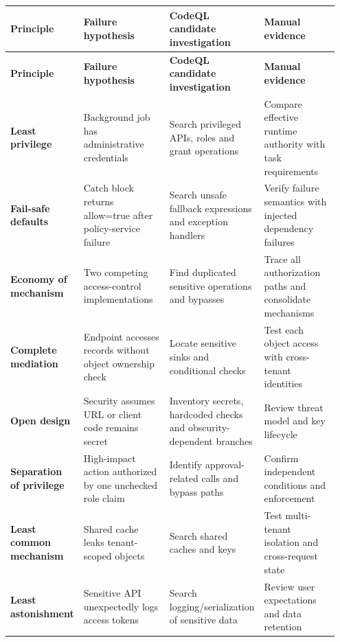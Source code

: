 \documentclass[11pt,letterpaper,oneside]{book}
\begin{document}
\small
\setlength{\tabcolsep}{2pt}
\renewcommand{\arraystretch}{1.18}
\begin{longtable}{>{\raggedright\arraybackslash}p{0.17\linewidth}>{\raggedright\arraybackslash}p{0.27\linewidth}>{\raggedright\arraybackslash}p{0.27\linewidth}>{\raggedright\arraybackslash}p{0.24\linewidth}}
\toprule
\textbf{Principle} & \textbf{Failure hypothesis} & \textbf{CodeQL candidate investigation} & \textbf{Manual evidence}\\
\midrule
\endfirsthead
\toprule
\textbf{Principle} & \textbf{Failure hypothesis} & \textbf{CodeQL candidate investigation} & \textbf{Manual evidence}\\
\midrule
\endhead
\textbf{Least privilege} & Background job has administrative credentials & Search privileged APIs, roles and grant operations & Compare effective runtime authority with task requirements\\
\textbf{Fail-safe defaults} & Catch block returns allow=true after policy-service failure & Search unsafe fallback expressions and exception handlers & Verify failure semantics with injected dependency failures\\
\textbf{Economy of mechanism} & Two competing access-control implementations & Find duplicated sensitive operations and bypasses & Trace all authorization paths and consolidate mechanisms\\
\textbf{Complete mediation} & Endpoint accesses records without object ownership check & Locate sensitive sinks and conditional checks & Test each object access with cross-tenant identities\\
\textbf{Open design} & Security assumes URL or client code remains secret & Inventory secrets, hardcoded checks and obscurity-dependent branches & Review threat model and key lifecycle\\
\textbf{Separation of privilege} & High-impact action authorized by one unchecked role claim & Identify approval-related calls and bypass paths & Confirm independent conditions and enforcement\\
\textbf{Least common mechanism} & Shared cache leaks tenant-scoped objects & Search shared caches and keys & Test multi-tenant isolation and cross-request state\\
\textbf{Least astonishment} & Sensitive API unexpectedly logs access tokens & Search logging/serialization of sensitive data & Review user expectations and data retention\\
\bottomrule
\end{longtable}
\normalsize
\end{document}

